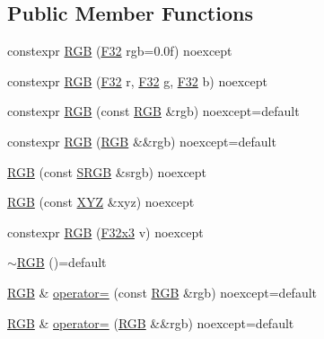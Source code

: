 \subsection*{Public Member Functions}
\begin{DoxyCompactItemize}
\item 
constexpr \mbox{\hyperlink{structmage_1_1_r_g_b_a166d2c13b46f9518c132c68f1117e5c6}{R\+GB}} (\mbox{\hyperlink{namespacemage_aa97e833b45f06d60a0a9c4fc22ae02c0}{F32}} rgb=0.\+0f) noexcept
\item 
constexpr \mbox{\hyperlink{structmage_1_1_r_g_b_af4304d8dc009f1b551442d6ebd15c0fa}{R\+GB}} (\mbox{\hyperlink{namespacemage_aa97e833b45f06d60a0a9c4fc22ae02c0}{F32}} r, \mbox{\hyperlink{namespacemage_aa97e833b45f06d60a0a9c4fc22ae02c0}{F32}} g, \mbox{\hyperlink{namespacemage_aa97e833b45f06d60a0a9c4fc22ae02c0}{F32}} b) noexcept
\item 
constexpr \mbox{\hyperlink{structmage_1_1_r_g_b_a1423c7c8dd83399b16cd33e367a5497c}{R\+GB}} (const \mbox{\hyperlink{structmage_1_1_r_g_b}{R\+GB}} \&rgb) noexcept=default
\item 
constexpr \mbox{\hyperlink{structmage_1_1_r_g_b_a852c4ed04bb38c7913d12fc491185bfb}{R\+GB}} (\mbox{\hyperlink{structmage_1_1_r_g_b}{R\+GB}} \&\&rgb) noexcept=default
\item 
\mbox{\hyperlink{structmage_1_1_r_g_b_a2f2c4eea3b0c44e0f31cfe20c6371d64}{R\+GB}} (const \mbox{\hyperlink{structmage_1_1_s_r_g_b}{S\+R\+GB}} \&srgb) noexcept
\item 
\mbox{\hyperlink{structmage_1_1_r_g_b_a62a2200960f84f1b6bd4b743510201a4}{R\+GB}} (const \mbox{\hyperlink{structmage_1_1_x_y_z}{X\+YZ}} \&xyz) noexcept
\item 
constexpr \mbox{\hyperlink{structmage_1_1_r_g_b_ab80d8120aabe4f52e8de6e99d1af7c8b}{R\+GB}} (\mbox{\hyperlink{namespacemage_a1e3c7a882af461f161caa1cbddaf1fa2}{F32x3}} v) noexcept
\item 
\mbox{\hyperlink{structmage_1_1_r_g_b_a2c01428e1da4ec354b85320a905beab3}{$\sim$\+R\+GB}} ()=default
\item 
\mbox{\hyperlink{structmage_1_1_r_g_b}{R\+GB}} \& \mbox{\hyperlink{structmage_1_1_r_g_b_a10fd47397bb4a691c951d44abfb77d7c}{operator=}} (const \mbox{\hyperlink{structmage_1_1_r_g_b}{R\+GB}} \&rgb) noexcept=default
\item 
\mbox{\hyperlink{structmage_1_1_r_g_b}{R\+GB}} \& \mbox{\hyperlink{structmage_1_1_r_g_b_add3b5995774c634d6e32af4d1cd6bfb3}{operator=}} (\mbox{\hyperlink{structmage_1_1_r_g_b}{R\+GB}} \&\&rgb) noexcept=default
\item 

\end{DoxyCompactItemize}
